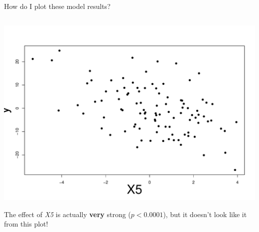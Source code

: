\documentclass[
  ignorenonframetext,
  aspectratio=169]{beamer}
\begin{document}
\begin{frame}[fragile]{How do I plot these model results?}
\begin{columns}[T]
\begin{column}{0.48\textwidth}
\includegraphics{03-Lecture_files/figure-beamer/unnamed-chunk-17-1.pdf}

\normalsize

The effect of \emph{X5} is actually \textbf{very} strong (\(p<0.0001\)),
but it doesn't look like it from this plot!
\end{column}
\end{columns}
\end{frame}
\end{document}
